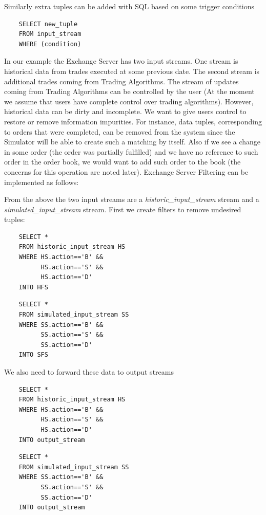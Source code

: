 \documentclass{article}
\begin{document}
\noindent Similarly extra tuples can be added with SQL based on some trigger conditions

\begin{verbatim}   
    SELECT new_tuple
    FROM input_stream
    WHERE (condition)
\end{verbatim}


In our example the Exchange Server has two input streams. One stream is historical data from trades executed at some previous date. The second stream is additional trades coming from Trading Algorithms. The stream of updates coming from Trading Algorithms can be controlled by the user (At the moment we assume that users have complete control over trading algorithms). However, historical data can be dirty and incomplete. We want to give users control to restore or remove information impurities. For instance, data tuples, corresponding to orders that were completed, can be removed from the system since the Simulator will be able to create such a matching by itself. Also if we see a change in some order (the order was partially fulfilled) and we have no reference to such order in the order book, we would want to add such order to the book (the concerns for this operation are noted later).
Exchange Server Filtering can be implemented as follows:

From the above the two input streams  are a \emph{historic\_input\_stream} stream and a \emph{simulated\_input\_stream} stream. First we create filters to remove undesired tuples:

\begin{verbatim}   
    SELECT * 
    FROM historic_input_stream HS
    WHERE HS.action=='B' &&
          HS.action=='S' &&
          HS.action=='D'
    INTO HFS
\end{verbatim}

\begin{verbatim}  
    SELECT *
    FROM simulated_input_stream SS
    WHERE SS.action=='B' &&
          SS.action=='S' &&
          SS.action=='D'
    INTO SFS
\end{verbatim}

\noindent We also need to forward these data to output streams

\begin{verbatim}   
    SELECT * 
    FROM historic_input_stream HS
    WHERE HS.action=='B' &&
          HS.action=='S' &&
          HS.action=='D'
    INTO output_stream
\end{verbatim}

\begin{verbatim}  
    SELECT *
    FROM simulated_input_stream SS
    WHERE SS.action=='B' &&
          SS.action=='S' &&
          SS.action=='D'
    INTO output_stream
\end{verbatim}
\end{document}
